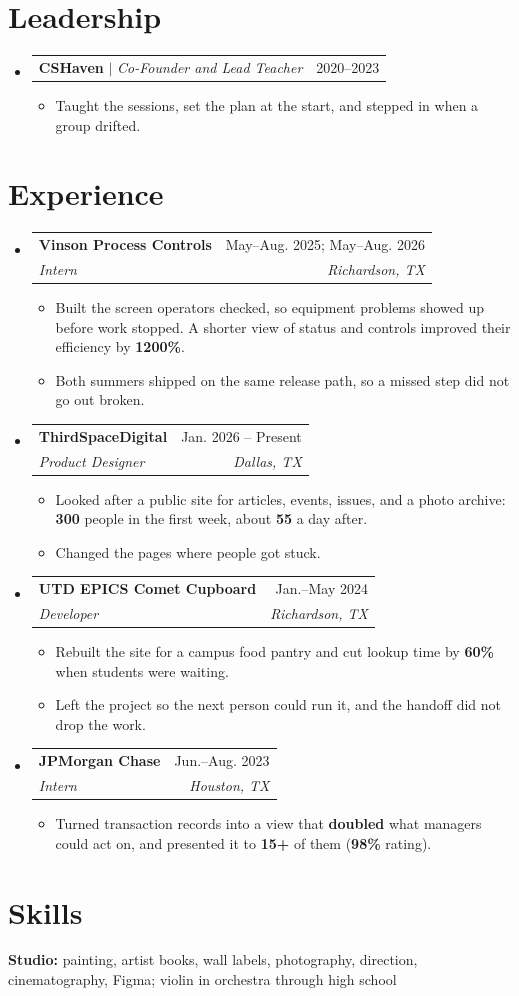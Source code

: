 \documentclass[letterpaper,11pt]{article}
\makeatletter
\newcommand{\resumeItem}[1]{
  \item\small{{#1 \vspace{-2pt}}}
}
\newcommand{\resumeSubheading}[4]{
  \vspace{-2pt}\item
    \begin{tabular*}{0.97\textwidth}[t]{l@{\extracolsep{\fill}}r}
      \textbf{#1} & #2 \\
      \textit{\small#3} & \textit{\small #4} \\
    \end{tabular*}\vspace{-7pt}
}
\newcommand{\resumeProjectHeading}[2]{
    \item
    \begin{tabular*}{0.97\textwidth}{l@{\extracolsep{\fill}}r}
      \small#1 & #2 \\
    \end{tabular*}\vspace{-7pt}
}
\newcommand{\resumeSubHeadingListStart}{\begin{itemize}[leftmargin=0.15in, label={}]}
\newcommand{\resumeSubHeadingListEnd}{\end{itemize}}
\newcommand{\resumeItemListStart}{\begin{itemize}}
\newcommand{\resumeItemListEnd}{\end{itemize}\vspace{-5pt}}
\makeatother
\begin{document}
\section{Leadership}
\resumeSubHeadingListStart
  \resumeProjectHeading
    {\textbf{CSHaven} $|$ \emph{Co-Founder and Lead Teacher}}{2020--2023}
  \resumeItemListStart
    \resumeItem{Taught the sessions, set the plan at the start, and stepped in when a group drifted.}
  \resumeItemListEnd
\resumeSubHeadingListEnd

\section{Experience}
\resumeSubHeadingListStart
  \resumeSubheading
    {Vinson Process Controls}{May--Aug. 2025; May--Aug. 2026}
    {Intern}{Richardson, TX}
  \resumeItemListStart
    \resumeItem{Built the screen operators checked, so equipment problems showed up before work stopped. A shorter view of status and controls improved their efficiency by \textbf{1200\%}.}
    \resumeItem{Both summers shipped on the same release path, so a missed step did not go out broken.}
  \resumeItemListEnd

  \resumeSubheading
    {ThirdSpaceDigital}{Jan. 2026 -- Present}
    {Product Designer}{Dallas, TX}
  \resumeItemListStart
    \resumeItem{Looked after a public site for articles, events, issues, and a photo archive: \textbf{300} people in the first week, about \textbf{55} a day after.}
    \resumeItem{Changed the pages where people got stuck.}
  \resumeItemListEnd

  \resumeSubheading
    {UTD EPICS Comet Cupboard}{Jan.--May 2024}
    {Developer}{Richardson, TX}
  \resumeItemListStart
    \resumeItem{Rebuilt the site for a campus food pantry and cut lookup time by \textbf{60\%} when students were waiting.}
    \resumeItem{Left the project so the next person could run it, and the handoff did not drop the work.}
  \resumeItemListEnd

  \resumeSubheading
    {JPMorgan Chase}{Jun.--Aug. 2023}
    {Intern}{Houston, TX}
  \resumeItemListStart
    \resumeItem{Turned transaction records into a view that \textbf{doubled} what managers could act on, and presented it to \textbf{15+} of them (\textbf{98\%} rating).}
  \resumeItemListEnd
\resumeSubHeadingListEnd

\section{Skills}
\begin{itemize}[leftmargin=0.15in, label={}]
  \small{\item{
    \textbf{Studio:} painting, artist books, wall labels, photography, direction, cinematography, Figma; violin in orchestra through high school
  }}
\end{itemize}
\end{document}
